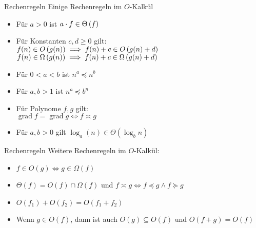 \begin{frame}{Rechenregeln}
	Einige Rechenregeln im $O$-Kalkül
	\begin{itemize}[<+->]
		\item Für $a > 0$ ist $a \cdot f \in \Theta\left(f\right)$ 
		\item Für Konstanten $c, d \geq 0$ gilt: \\ 
			\quad $f(n) \in \Oh{g(n)} \Impl f(n) + c \in \Oh{g(n) + d}$ \\
			\quad $f(n) \in \Om{g(n)} \Impl f(n) + c \in \Om{g(n) + d}$ \\
		\item Für $0 < a < b$ ist $n^a \preceq n^b$
		\item Für $a,b > 1$ ist $n^a \preceq b^n$ 
		\item Für Polynome $f,g$ gilt: \\
			\quad $\mathop{\text{grad}} f = \mathop{\text{grad}} g \iff f \asymp g $
		\item Für $a,b > 0$ gilt $\log_a(n) \in \Theta(\log_b n)$
		
	\end{itemize}
\end{frame}


\begin{frame}{Rechenregeln}
	Weitere Rechenregeln im $O$-Kalkül:
	\begin{itemize}[<+->]
		\item $f \in O(g) \iff g \in \Omega(f)$
		\item $\Theta(f) = O(f) \cap \Omega(f)$ und $f \asymp g \iff f \preceq g \wedge f \succeq g$ 
		\item $O(f_1) + O(f_2) = O(f_1 + f_2)$
		\item Wenn $g \in O(f)$, dann ist auch $O(g) \subseteq O(f)$ und $O(f + g) = O(f)$
	\end{itemize}
	
\end{frame}

